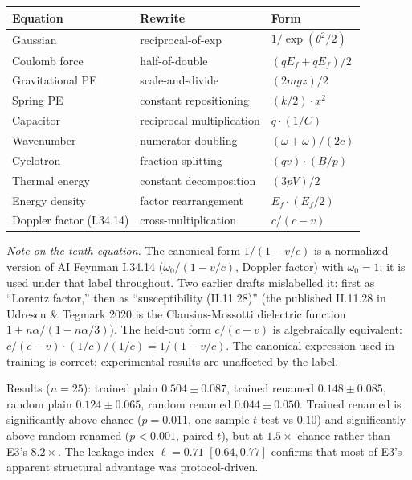 \begin{center}\small
\begin{tabular}{lll}
\toprule
Equation & Rewrite & Form \\
\midrule
Gaussian & reciprocal-of-exp & $1/\exp(\theta^2/2)$ \\
Coulomb force & half-of-double & $(qE_f + qE_f)/2$ \\
Gravitational PE & scale-and-divide & $(2mgz)/2$ \\
Spring PE & constant repositioning & $(k/2) \cdot x^2$ \\
Capacitor & reciprocal multiplication & $q \cdot (1/C)$ \\
Wavenumber & numerator doubling & $(\omega+\omega)/(2c)$ \\
Cyclotron & fraction splitting & $(qv) \cdot (B/p)$ \\
Thermal energy & constant decomposition & $(3pV)/2$ \\
Energy density & factor rearrangement & $E_f \cdot (E_f/2)$ \\
Doppler factor (I.34.14) & cross-multiplication & $c/(c-v)$ \\
\bottomrule
\end{tabular}
\end{center}

\noindent\textit{Note on the tenth equation.} The canonical form $1/(1 - v/c)$ is a normalized version of AI Feynman I.34.14 ($\omega_0/(1-v/c)$, Doppler factor) with $\omega_0 = 1$; it is used under that label throughout. Two earlier drafts mislabelled it: first as ``Lorentz factor,'' then as ``susceptibility (II.11.28)'' (the published II.11.28 in Udrescu \& Tegmark 2020 is the Clausius-Mossotti dielectric function $1 + n\alpha/(1-n\alpha/3)$). The held-out form $c/(c-v)$ is algebraically equivalent: $c/(c-v) \cdot (1/c)/(1/c) = 1/(1-v/c)$. The canonical expression used in training is correct; experimental results are unaffected by the label.

Results ($n{=}25$): trained plain $0.504 \pm 0.087$, trained renamed $0.148 \pm 0.085$, random plain $0.124 \pm 0.065$, random renamed $0.044 \pm 0.050$. Trained renamed is significantly above chance ($p{=}0.011$, one-sample $t$-test vs $0.10$) and significantly above random renamed ($p{<}0.001$, paired $t$), but at $1.5\times$ chance rather than E3's $8.2\times$. The leakage index $\ell{=}0.71$ $[0.64, 0.77]$ confirms that most of E3's apparent structural advantage was protocol-driven.

